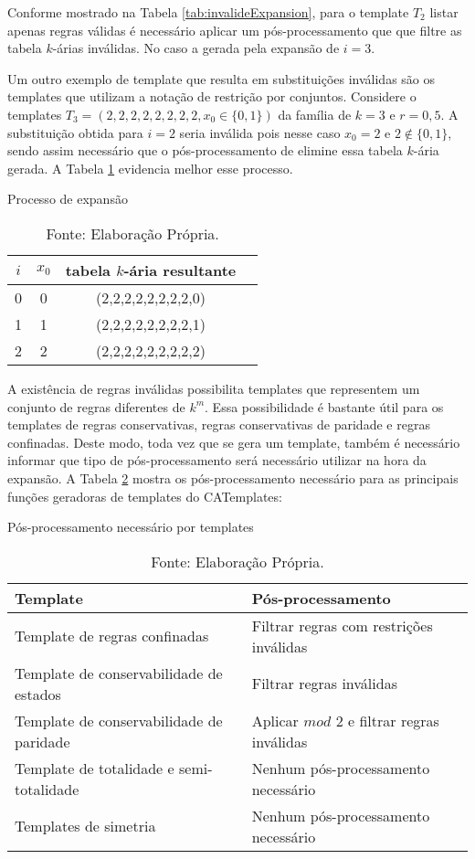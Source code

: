 Conforme mostrado na Tabela \ref{tab:invalideExpansion}, para o template $T_2$ listar apenas regras válidas é necessário aplicar um pós-processamento que que filtre as tabela $k$-árias inválidas. No caso a gerada pela expansão de $i = 3$. 

Um outro exemplo de template que resulta em substituições inválidas são os templates que utilizam a notação de restrição por conjuntos. Considere o templates $T_3 = (2,2,2,2,2,2,2,2,x_0\in \{0,1\})$ da família de $k=3$ e $r=0{,}5$. %
A substituição obtida para $i = 2$ seria inválida pois nesse caso $x_0 = 2$ e $2 \notin \{0,1\}$, sendo assim necessário que o pós-processamento de elimine essa tabela $k$-ária gerada. A Tabela \ref{tab:invalideExpansion2} evidencia melhor esse processo.
\begin{table}[h!]
\centering
\caption{Processo de expansão}
	\begin{tabular}{cccc}
    \toprule
	$i$ & $x_0$ & tabela $k$-ária resultante \\
    \midrule
	0	&	0	&	(2,2,2,2,2,2,2,2,0)	\\
	1	&	1	&	(2,2,2,2,2,2,2,2,1)	\\
	2	&	2	&	(2,2,2,2,2,2,2,2,2)	\\
    \bottomrule
	\end{tabular}
\caption*{Fonte: Elaboração Própria.}
\label{tab:invalideExpansion2}
\end{table}

A existência de regras inválidas possibilita templates que representem um conjunto de regras diferentes de $k^m$. Essa possibilidade é bastante útil para os templates de regras conservativas, regras conservativas de paridade e regras confinadas. Deste modo, toda vez que se gera um template, também é necessário informar que tipo de pós-processamento será necessário utilizar na hora da expansão. A Tabela \ref{tab:posProcessamento} mostra os pós-processamento necessário para as principais funções geradoras de templates do CATemplates:
\begin{table}[h!]
\centering
\caption{Pós-processamento necessário por templates}
	\begin{tabular}{ll}
    \toprule
	Template & Pós-processamento \\
    \midrule
	Template de regras confinadas 				& Filtrar regras com restrições inválidas	\\
	Template de conservabilidade de estados		& Filtrar regras inválidas						\\
	Template de conservabilidade de paridade 	& Aplicar $mod$ $2$ e filtrar regras inválidas	\\
	Template de totalidade e semi-totalidade 	& Nenhum pós-processamento necessário 				\\
	Templates de simetria		 				& Nenhum pós-processamento necessário 				\\
    \bottomrule
	\end{tabular}
\caption*{Fonte: Elaboração Própria.}
\label{tab:posProcessamento}
\end{table}

